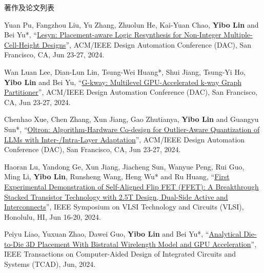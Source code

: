 \begin{rSection}{著作及论文列表}
\begin{description}[font=\normalfont, rightmargin=2em]
{}
            

\item[{[C152]}]{
        Yuan Pu, Fangzhou Liu, Yu Zhang, Zhuolun He, Kai-Yuan Chao, \textbf{Yibo Lin} and Bei Yu*, 
    ``\href{https://doi.org/10.1145/3649329.3656243}{Lesyn: Placement-aware Logic Resynthesis for Non-Integer Multiple-Cell-Height Designs}'', 
    ACM/IEEE Design Automation Conference (DAC), San Francisco, CA, Jun 23-27, 2024.
    
}
            

\item[{[C151]}]{
        Wan Luan Lee, Dian-Lun Lin, Tsung-Wei Huang*, Shui Jiang, Tsung-Yi Ho, \textbf{Yibo Lin} and Bei Yu, 
    ``\href{https://doi.org/10.1145/3649329.3656238}{G-kway: Multilevel GPU-Accelerated k-way Graph Partitioner}'', 
    ACM/IEEE Design Automation Conference (DAC), San Francisco, CA, Jun 23-27, 2024.
    
}
            

\item[{[C150]}]{
        Chenhao Xue, Chen Zhang, Xun Jiang, Gao Zhutianya, \textbf{Yibo Lin} and Guangyu Sun*, 
    ``\href{https://doi.org/10.1145/3649329.3656221}{Oltron: Algorithm-Hardware Co-design for Outlier-Aware Quantization of LLMs with Inter-/Intra-Layer Adaptation}'', 
    ACM/IEEE Design Automation Conference (DAC), San Francisco, CA, Jun 23-27, 2024.
    
}
            

\item[{[C149]}]{
        Haoran Lu, Yandong Ge, Xun Jiang, Jiacheng Sun, Wanyue Peng, Rui Guo, Ming Li, \textbf{Yibo Lin}, Runsheng Wang, Heng Wu* and Ru Huang, 
    ``\href{https://doi.org/10.1109/VLSITechnologyandCir46783.2024.10631460}{First Experimental Demonstration of Self-Aligned Flip FET (FFET): A Breakthrough Stacked Transistor Technology with 2.5T Design, Dual-Side Active and Interconnects}'', 
    IEEE Symposium on VLSI Technology and Circuits (VLSI), Honolulu, HI, Jun 16-20, 2024.
    
}
            

\item[{[J148]}]{
        Peiyu Liao, Yuxuan Zhao, Dawei Guo, \textbf{Yibo Lin} and Bei Yu*, 
    ``\href{https://doi.org/10.1109/TCAD.2023.3347293}{Analytical Die-to-Die 3D Placement With Bistratal Wirelength Model and GPU Acceleration}'', 
    IEEE Transactions on Computer-Aided Design of Integrated Circuits and Systems (TCAD), Jun, 2024.
    
}
            


\end{description}
\end{rSection}
